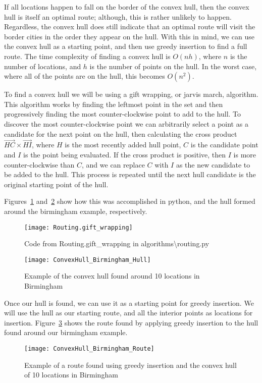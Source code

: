 \noindent
If all locations happen to fall on the border of the convex hull, then the convex hull is itself an optimal route;
although, this is rather unlikely to happen.
Regardless, the convex hull does still indicate that an optimal route will visit the border cities in the order they
appear on the hull.
With this in mind, we can use the convex hull as a starting point, and then use greedy insertion to find a full route.
The time complexity of finding a convex hull is $O(nh)$, where $n$ is the number of locations, and $h$ is the number
of points on the hull. In the worst case, where all of the points are on the hull, this becomes $O(n^2)$.

To find a convex hull we will be using a gift wrapping, or jarvis march, algorithm.
This algorithm works by finding the leftmost point in the set and then progressively finding the most counter-clockwise
point to add to the hull.
To discover the most counter-clockwise point we can arbitrarily select a point as a candidate for the next point on
the hull, then calculating the cross product $\vec{HC} \times \vec{HI}$, where $H$ is the most recently added hull
point, $C$ is the candidate point and $I$ is the point being evaluated.
If the cross product is positive, then $I$ is more counter-clockwise than $C$, and we can replace $C$ with $I$ as
the new candidate to be added to the hull.
This process is repeated until the next hull candidate is the original starting point of the hull.

Figures~\ref{fig:Routing.gift_wrapping} and~\ref{fig:ConvexHull_Birmingham_Hull} show how this was accomplished in
python, and the hull formed around the birmingham example, respectively.
\begin{figure}[H]
    \centering
    \texttt{[image: Routing.gift\_wrapping]}
    \caption{Code from Routing.gift\_wrapping in algorithms\textbackslash routing.py}
    \label{fig:Routing.gift_wrapping}
\end{figure}
\begin{figure}[H]
    \centering
    \texttt{[image: ConvexHull\_Birmingham\_Hull]}
    \caption{Example of the convex hull found around 10 locations in Birmingham}
    \label{fig:ConvexHull_Birmingham_Hull}
\end{figure}

\noindent
Once our hull is found, we can use it as a starting point for greedy insertion.
We will use the hull as our starting route, and all the interior points as locations for insertion.
Figure~\ref{fig:ConvexHull_Birmingham_Route} shows the route found by applying greedy insertion to the hull found
around our birmingham example.
\begin{figure}[H]
    \centering
    \texttt{[image: ConvexHull\_Birmingham\_Route]}
    \caption{Example of a route found using greedy insertion and the convex hull of 10 locations in Birmingham}
    \label{fig:ConvexHull_Birmingham_Route}
\end{figure}

